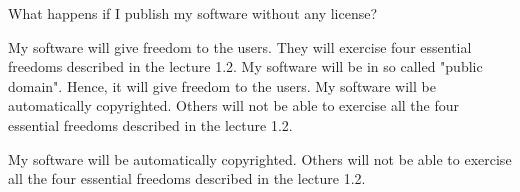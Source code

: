 \begin{question}[type=exam]
What happens if I publish my software without any license?
\begin{itemize}
\chk My software will give freedom to the users. They will exercise four essential freedoms described in the lecture 1.2.
\chk My software will be in so called "public domain". Hence, it will give freedom to the users.
\chk My software will be automatically copyrighted. Others will not be able to exercise all the four essential freedoms described in the lecture 1.2.
\end{itemize}
\end{question}
\begin{solution}
My software will be automatically copyrighted. Others will not be able to exercise all the four essential freedoms described in the lecture 1.2.
\end{solution}



